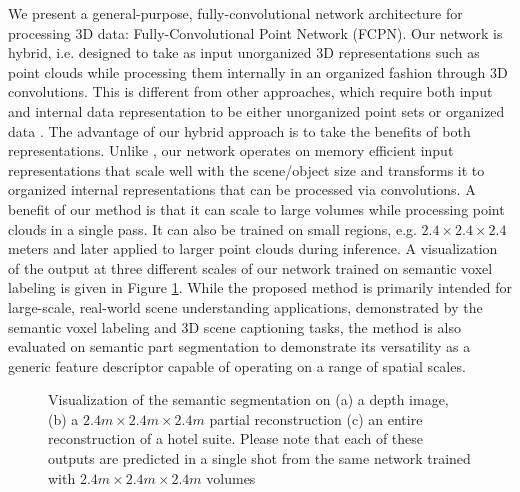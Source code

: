 \documentclass[runningheads]{llncs}
\begin{document}
We present a general-purpose, fully-convolutional network architecture for processing 3D data: Fully-Convolutional Point Network (FCPN). Our network is hybrid, i.e. designed to take as input unorganized 3D representations such as point clouds while processing them internally in an organized fashion through 3D convolutions. This is different from other approaches, which require both input and internal data representation to be either unorganized point sets \cite{Qi2017,Qi2017_2,Manessi2018} or organized data \cite{Song2016,Dai2017}. The advantage of our hybrid approach is to take the benefits of both representations. Unlike \cite{Song2016,Dai2017}, our network operates on memory efficient input representations that scale well with the scene/object size and transforms it to organized internal representations that can be processed via convolutions. 
A benefit of our method is that it can scale to large volumes while processing point clouds in a single pass. It can also be trained on small regions, e.g. $2.4 \times 2.4 \times 2.4$ meters and later applied to larger point clouds during inference. A visualization of the output at three different scales of our network trained on semantic voxel labeling is given in Figure \ref{fig:scale_results}.
While the proposed method is primarily intended for large-scale, real-world scene understanding applications, demonstrated by the semantic voxel labeling and 3D scene captioning tasks, the method is also evaluated on semantic part segmentation to demonstrate its versatility as a generic feature descriptor capable of operating on a range of spatial scales.

\begin{figure}[h]\centering
    \caption{Visualization of the semantic segmentation on (a) a depth image, (b) a $2.4m \times 2.4m \times 2.4m$ partial reconstruction (c) an entire reconstruction of a hotel suite. Please note that each of these outputs are predicted in a single shot from the same network trained with $2.4m \times 2.4m \times 2.4m$ volumes}\label{fig:scale_results}\end{figure}
\end{document}
